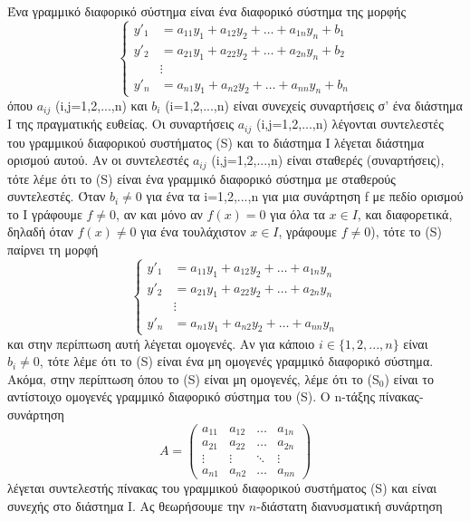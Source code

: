 \documentclass[11pt,a4paper,twoside]{book}
\begin{document}
Ένα γραμμικό διαφορικό σύστημα είναι ένα διαφορικό σύστημα της μορφής
\begin{equation} \tag{S}
\left\{
\begin{aligned}
    y'_1 &= a_{11}y_1+a_{12}y_2+\dots+a_{1n}y_n+b_1 \\
    y'_2 &= a_{21}y_1+a_{22}y_2+\dots+a_{2n}y_n+b_2 \\
    &\vdots \\
    y'_n &= a_{n1}y_1+a_{n2}y_2+\dots+a_{nn}y_n+b_n
\end{aligned}
\right.
\end{equation}
όπου $a_{ij}$ (i,j=1,2,...,n) και $b_i$ (i=1,2,...,n) είναι συνεχείς συναρτήσεις σ' ένα διάστημα Ι της πραγματικής ευθείας. Οι συναρτήσεις $a_{ij}$ (i,j=1,2,...,n) λέγονται συντελεστές του γραμμικού διαφορικού συστήματος (S) και το διάστημα Ι λέγεται διάστημα ορισμού αυτού. Αν οι συντελεστές $a_{ij}$ (i,j=1,2,...,n) είναι σταθερές (συναρτήσεις), τότε λέμε ότι το (S) είναι ένα γραμμικό διαφορικό σύστημα με σταθερούς συντελεστές. Όταν $b_i \ne 0$ για ένα τα i=1,2,...,n για μια συνάρτηση f με πεδίο ορισμού το Ι γράφουμε $f \ne 0$, αν και μόνο αν $f(x)=0$ για όλα τα $x \in I$, και διαφορετικά, δηλαδή όταν $f(x)\ne 0$ για ένα τουλάχιστον $x \in I$, γράφουμε $f \ne 0$), τότε το (S) παίρνει τη μορφή
\begin{equation} \tag{S$_0$}
\left\{
\begin{aligned}
    y'_1 &= a_{11}y_1+a_{12}y_2+\dots+a_{1n}y_n \\
    y'_2 &= a_{21}y_1+a_{22}y_2+\dots+a_{2n}y_n \\
    &\vdots \\
    y'_n &= a_{n1}y_1+a_{n2}y_2+\dots+a_{nn}y_n
\end{aligned}
\right.
\end{equation}
και στην περίπτωση αυτή λέγεται ομογενές. Αν για κάποιο $i \in \{1,2,...,n\}$ είναι $b_i \ne 0$, τότε λέμε ότι το (S) είναι ένα μη ομογενές γραμμικό διαφορικό σύστημα. Ακόμα, στην περίπτωση όπου το (S) είναι μη ομογενές, λέμε ότι το (S$_0$) είναι το αντίστοιχο ομογενές γραμμικό διαφορικό σύστημα του (S). Ο n-τάξης πίνακας-συνάρτηση
\[
A = \begin{pmatrix}
    a_{11} & a_{12} & \dots & a_{1n} \\
    a_{21} & a_{22} & \dots & a_{2n} \\
    \vdots & \vdots & \ddots & \vdots \\
    a_{n1} & a_{n2} & \dots & a_{nn}
\end{pmatrix}
\]
λέγεται συντελεστής πίνακας του γραμμικού διαφορικού συστήματος (S) και είναι συνεχής στο διάστημα Ι. Ας θεωρήσουμε την $n$-διάστατη διανυσματική συνάρτηση
\end{document}
